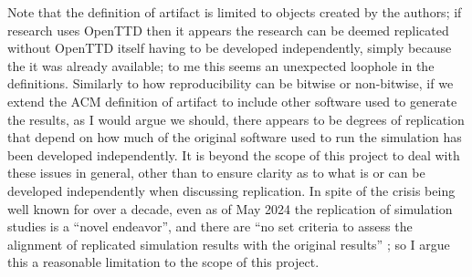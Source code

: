 \documentclass[logo,msc,dsti]{style/infthesis}    %
\begin{document}
Note that the definition of artifact is limited to objects created by the authors; if research uses OpenTTD then it appears the research can be deemed replicated without OpenTTD itself having to be developed independently, simply because the it was already available; to me this seems an unexpected loophole in the definitions. Similarly to how reproducibility can be bitwise or non-bitwise, if we extend the ACM definition of artifact to include other software used to generate the results, as I would argue we should, there appears to be degrees of replication that depend on how much of the original software used to run the simulation has been developed independently. It is beyond the scope of this project to deal with these issues in general, other than to ensure clarity as to what is or can be developed independently when discussing replication. In spite of the crisis being well known for over a decade, even as of May 2024 the replication of simulation studies is a ``novel endeavor'', 
and there are ``no set criteria to assess the alignment of replicated simulation results with the original results'' \cite{luijken2024replicability}; so I argue this a reasonable limitation to the scope of this project.






\end{document}
